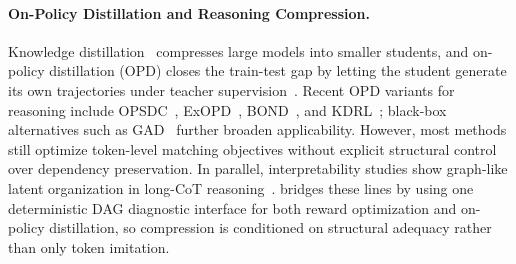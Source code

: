 \paragraph{On-Policy Distillation and Reasoning Compression.}
Knowledge distillation~\citep{hinton2015distilling} compresses large models into smaller students, and on-policy distillation (OPD) closes the train-test gap by letting the student generate its own trajectories under teacher supervision~\citep{minillm2023,agarwal2024gkd,song2026opdsurvey}.
Recent OPD variants for reasoning include OPSDC~\citep{opsdc2026}, ExOPD~\citep{yang2026exopd}, BOND~\citep{sessa2024bond}, and KDRL~\citep{xu2025kdrl}; black-box alternatives such as GAD~\citep{ye2025gad} further broaden applicability. However, most methods still optimize token-level matching objectives without explicit structural control over dependency preservation. In parallel, interpretability studies show graph-like latent organization in long-CoT reasoning~\citep{besta2024graph,zhong2026chains2dags}. \method bridges these lines by using one deterministic DAG diagnostic interface for both reward optimization and on-policy distillation, so compression is conditioned on structural adequacy rather than only token imitation.
